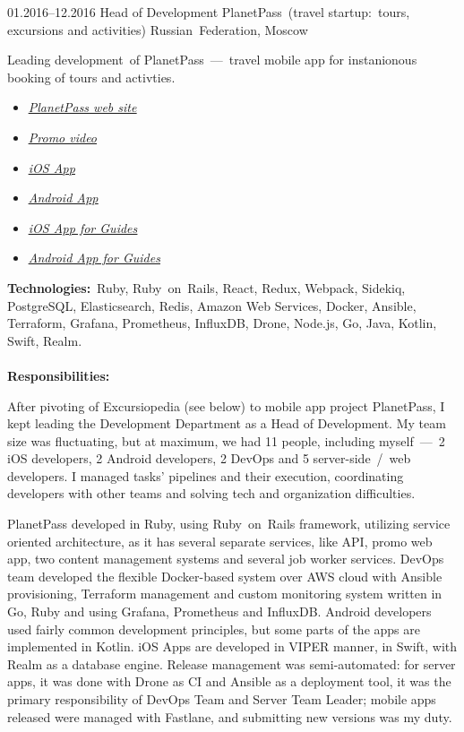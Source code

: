 \documentclass[12pt,a4paper,final]{moderncv}
\begin{document}
\cventry
{01.2016--12.2016}
{Head of Development}
{PlanetPass~(travel startup:~tours, excursions and activities)}
{Russian~Federation, Moscow}
{}
{
  Leading development~of PlanetPass~---~travel mobile app for instanionous booking of tours and activties.
  \bigskip
  \begin{itemize}
    \item \underline{\href{https://planetpass.com}{\itshape PlanetPass web site}}
    \item \underline{\href{https://vimeo.com/176452074}{\itshape Promo video}}
    \item \underline{\href{https://itunes.apple.com/us/app/planetpass-city-walks-with-guides/id1087995218}{\itshape iOS App}}
    \item \underline{\href{https://play.google.com/store/apps/details?id=com.excursiopedia.planetpass}{\itshape Android App}}
    \item \underline{\href{https://itunes.apple.com/us/app/tool-for-guides/id1129160306}{\itshape iOS App for Guides}}
    \item \underline{\href{https://play.google.com/store/apps/details?id=com.excursiopedia.guide}{\itshape Android App for Guides}}
  \end{itemize}
  \bigskip
  \textbf{Technologies:}~Ruby, Ruby~on~Rails, React, Redux, Webpack, Sidekiq, PostgreSQL, Elasticsearch, Redis, Amazon Web Services, Docker, Ansible, Terraform, Grafana, Prometheus, InfluxDB, Drone, Node.js, Go, Java, Kotlin, Swift, Realm.
  \\\\
  \textbf{Responsibilities:}\\
  {\parindent=1cm
    After pivoting of Excursiopedia (see below) to mobile app project PlanetPass, I kept leading the Development Department as a Head of Development. My team size was fluctuating, but at maximum, we had 11 people, including myself~---~2 iOS developers, 2 Android developers, 2 DevOps and 5 server-side~/~web developers. I managed tasks' pipelines and their execution, coordinating developers with other teams and solving tech and organization difficulties.

    PlanetPass developed in Ruby, using Ruby~on~Rails framework, utilizing service oriented architecture, as it has several separate services, like API, promo web app, two content management systems and several job worker services. DevOps team developed the flexible Docker-based system over AWS cloud with Ansible provisioning, Terraform management and custom monitoring system written in Go, Ruby and using Grafana, Prometheus and InfluxDB. Android developers used fairly common development principles, but some parts of the apps are implemented in Kotlin. iOS Apps are developed in VIPER manner, in Swift, with Realm as a database engine. Release management was semi-automated: for server apps, it was done with Drone as CI and Ansible as a deployment tool, it was the primary responsibility of DevOps Team and Server Team Leader; mobile apps released were managed with Fastlane, and submitting new versions was my duty.

}}
\end{document}
